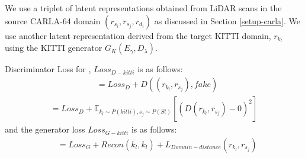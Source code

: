 We use a triplet of latent representations obtained from LiDAR scans in the source CARLA-64 domain $(r_{s_i}, r_{s_j}, r_{d_i})$ as discussed in Section \ref{setup-carla}. We use another latent representation derived from the target KITTI domain, $r_{k_l}$  using the KITTI generator $G_{K}(E_\gamma,D_\lambda)$.


    Discriminator Loss for \dslruda{}, $Loss_{D-kitti}$ is as follows:
    \begin{equation}
    \begin{split}
           &= Loss_{D} +  D((r_{k_l}, r_{s_j}), fake)  
    \end{split}
    \end{equation}  
    \begin{equation}
        \begin{split}        
           =Loss_{D} +  {\mathbb{E}}_{k_l\sim P(kitti),s_j\sim P(St)}[(D(r_{k_l},r_{s_j}) - 0)^{2}] 
    \end{split}
    \end{equation}
    and the generator loss $Loss_{G-kitti}$ is as follows:
    \begin{equation}
    \begin{split}
           &= Loss_{G} +  Recon(\overline{k_l}, k_l)
           +L_{Domain-distance}(r_{k_l},r_{s_j})
    \end{split}
    \end{equation}